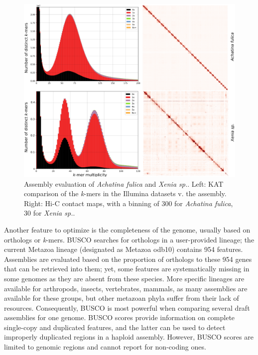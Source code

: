 \begin{figure}
    \centering
    \includegraphics[width=\textwidth]{fig/review_assembly_evaluation.eps}
    \caption{Assembly evaluation of \textit{Achatina fulica} and \textit{Xenia sp.}. Left: KAT comparison of the \textit{k}-mers in the Illumina datasets v. the assembly. Right: Hi-C contact maps, with a binning of 300 for \textit{Achatina fulica}, 30 for \textit{Xenia sp.}.}
    \label{fig:evaluation}
\end{figure}

Another feature to optimize is the completeness of the genome, usually based on orthologs or \textit{k}-mers. BUSCO \cite{busco_evaluation} searches for orthologs in a user-provided lineage; the current Metazoa lineage (designated as Metazoa odb10) contains 954 features. Assemblies are evaluated based on the proportion of orthologs to these 954 genes that can be retrieved into them; yet, some features are systematically missing in some genomes as they are absent from these species. More specific lineages are available for arthropods, insects, vertebrates, mammals, as many assemblies are available for these groups, but other metazoan phyla suffer from their lack of resources. Consequently, BUSCO is most powerful when comparing several draft assemblies for one genome. BUSCO scores provide information on complete single-copy and duplicated features, and the latter can be used to detect improperly duplicated regions in a haploid assembly. However, BUSCO scores are limited to genomic regions and cannot report for non-coding ones. \\

